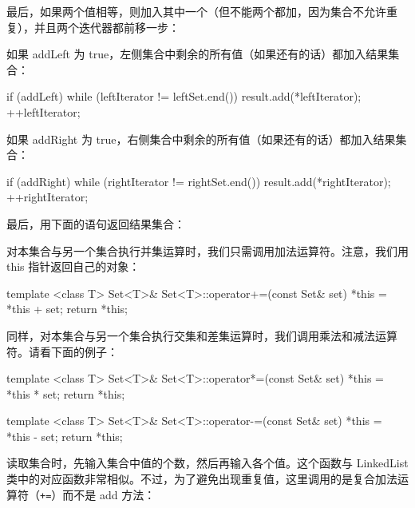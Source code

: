 最后，如果两个值相等，则加入其中一个（但不能两个都加，因为集合不允许重复），并且两个迭代器都前移一步：

\begin{codebox}
    else {
      if (addEqual) {
        result.add(*leftIterator);
      }

      ++leftIterator;
      ++rightIterator;
    }
  }
\end{codebox}

如果 addLeft 为 true，左侧集合中剩余的所有值（如果还有的话）都加入结果集合：

\begin{codebox}
  if (addLeft) {
    while (leftIterator != leftSet.end()) {
      result.add(*leftIterator);
      ++leftIterator;
    }
  }
\end{codebox}

如果 addRight 为 true，右侧集合中剩余的所有值（如果还有的话）都加入结果集合：

\begin{codebox}
  if (addRight) {
    while (rightIterator != rightSet.end()) {
      result.add(*rightIterator);
      ++rightIterator;
    }
  }
\end{codebox}

最后，用下面的语句返回结果集合：

\begin{codebox}
  return result;
}
\end{codebox}

对本集合与另一个集合执行并集运算时，我们只需调用加法运算符。注意，我们用 this 指针返回自己的对象：

\begin{codebox}
template <class T>
Set<T>& Set<T>::operator+=(const Set& set) {
  *this = *this + set;
  return *this;
}
\end{codebox}

同样，对本集合与另一个集合执行交集和差集运算时，我们调用乘法和减法运算符。请看下面的例子：

\begin{codebox}
template <class T>
Set<T>& Set<T>::operator*=(const Set& set) {
  *this = *this * set;
  return *this;
}

template <class T>
Set<T>& Set<T>::operator-=(const Set& set) {
  *this = *this - set;
  return *this;
}
\end{codebox}

读取集合时，先输入集合中值的个数，然后再输入各个值。这个函数与 LinkedList 类中的对应函数非常相似。不过，为了避免出现重复值，这里调用的是复合加法运算符（\texttt{+=}）而不是 add 方法：

